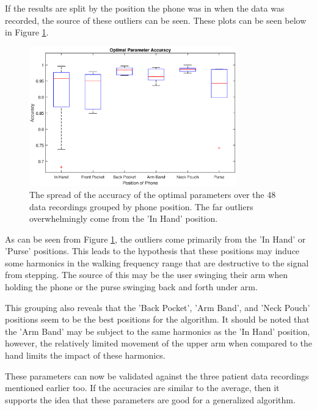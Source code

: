             If the results are split by the position the phone was in when the data was recorded, the source of these outliers can be seen. These plots can be seen below in Figure \ref{img_opt_params_positions_bp}.

            \begin{figure}[!th]
                \includegraphics[width=0.8\textwidth]{Images/opt_params_positions_bp.eps}
                \centering
                \caption{The spread of the accuracy of the optimal parameters over the 48 data recordings grouped by phone position. The far outliers overwhelmingly come from the 'In Hand' position.}
                \label{img_opt_params_positions_bp}
            \end{figure}

            As can be seen from Figure \ref{img_opt_params_positions_bp}, the outliers come primarily from the 'In Hand' or 'Purse' positions. This leads to the hypothesis that these positions may induce some harmonics in the walking frequency range that are destructive to the signal from stepping. The source of this may be the user swinging their arm when holding the phone or the purse swinging back and forth under arm.

            This grouping also reveals that the 'Back Pocket', 'Arm Band', and 'Neck Pouch' positions seem to be the best positions for the algorithm. It should be noted that the 'Arm Band' may be subject to the same harmonics as the 'In Hand' position, however, the relatively limited movement of the upper arm when compared to the hand limits the impact of these harmonics.

            These parameters can now be validated against the three patient data recordings mentioned earlier too. If the accuracies are similar to the average, then it supports the idea that these parameters are good for a generalized algorithm.

